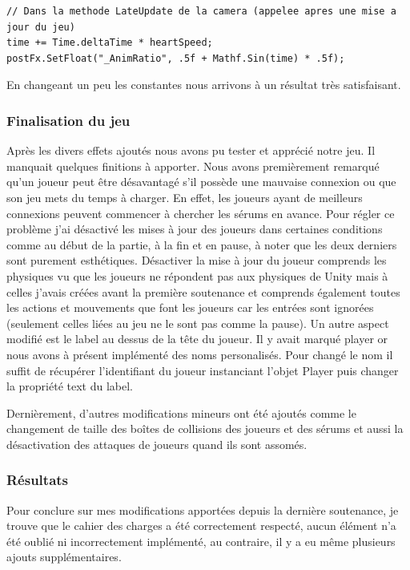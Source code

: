 \documentclass{article}
\begin{document}
\begin{lstlisting}
// Dans la methode LateUpdate de la camera (appelee apres une mise a jour du jeu)
time += Time.deltaTime * heartSpeed;
postFx.SetFloat("_AnimRatio", .5f + Mathf.Sin(time) * .5f);
\end{lstlisting}

En changeant un peu les constantes nous arrivons à un résultat très satisfaisant.

\subsubsection{Finalisation du jeu}

Après les divers effets ajoutés nous avons pu tester et apprécié notre jeu. Il manquait quelques finitions à apporter.
Nous avons premièrement remarqué qu'un joueur peut être désavantagé s'il possède une mauvaise connexion ou que son jeu mets du temps à charger. En effet, les joueurs ayant de meilleurs connexions peuvent commencer à chercher les sérums en avance. Pour régler ce problème j'ai désactivé les mises à jour des joueurs dans certaines conditions comme au début de la partie, à la fin et en pause, à noter que les deux derniers sont purement esthétiques. Désactiver la mise à jour du joueur comprends les physiques vu que les joueurs ne répondent pas aux physiques de Unity mais à celles j'avais créées avant la première soutenance et comprends également toutes les actions et mouvements que font les joueurs car les entrées sont ignorées (seulement celles liées au jeu ne le sont pas comme la pause).
Un autre aspect modifié est le label au dessus de la tête du joueur. Il y avait marqué player or nous avons à présent implémenté des noms personalisés. Pour changé le nom il suffit de récupérer l'identifiant du joueur instanciant l'objet Player puis changer la propriété text du label.

Dernièrement, d'autres modifications mineurs ont été ajoutés comme le changement de taille des boîtes de collisions des joueurs et des sérums et aussi la désactivation des attaques de joueurs quand ils sont assomés.

\subsubsection{Résultats}

Pour conclure sur mes modifications apportées depuis la dernière soutenance, je trouve que le cahier des charges a été correctement respecté, aucun élément n'a été oublié ni incorrectement implémenté, au contraire, il y a eu même plusieurs ajouts supplémentaires.
\end{document}
